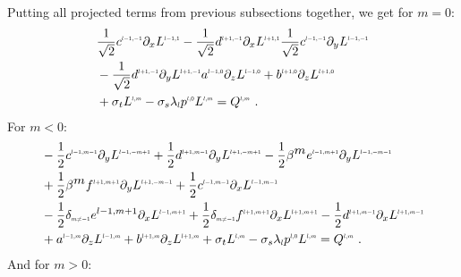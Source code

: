 \documentclass{egpubl}
\begin{document}
Putting all projected terms from previous subsections together, we get for $m=0$:
\begin{align}
&
\frac{1}{\sqrt{2}}c^{\scaleto{l-1,-1}{4pt}}\partial_x L^{\scaleto{l-1,1}{4pt}}
-\frac{1}{\sqrt{2}}d^{\scaleto{l+1,-1}{4pt}}\partial_x L^{\scaleto{l+1,1}{4pt}}
\frac{1}{\sqrt{2}}c^{\scaleto{l-1,-1}{4pt}}\partial_y L^{\scaleto{l-1,-1}{4pt}}
\nonumber
\\&
-\frac{1}{\sqrt{2}}d^{\scaleto{l+1,-1}{4pt}}\partial_y L^{\scaleto{l+1,-1}{4pt}}
a^{\scaleto{l-1,0}{4pt}}\partial_z L^{\scaleto{l-1,0}{4pt}}
+b^{\scaleto{l+1,0}{4pt}}\partial_z L^{\scaleto{l+1,0}{4pt}}
\nonumber
\\&
+\sigma_t L^{\scaleto{l,m}{4pt}}
-\sigma_s\lambda_{\scaleto{l}{4pt}}p^{\scaleto{l,0}{4pt}}L^{\scaleto{l,m}{4pt}}
= Q^{\scaleto{l,m}{4pt}} \ .
\end{align}
For $m<0$:
\begin{align}
&-\frac{1}{2}c^{\scaleto{l-1,m-1}{4pt}}
\partial_y
L^{\scaleto{l-1,-m+1}{4pt}}
+\frac{1}{2}d^{\scaleto{l+1,m-1}{4pt}}
\partial_y
L^{\scaleto{l+1,-m+1}{4pt}}
-\frac{1}{2}\beta^{\scaleto{m}{4pt}}e^{\scaleto{l-1,m+1}{4pt}}
\partial_y
L^{\scaleto{l-1,-m-1}{4pt}}
\nonumber
\\&
+\frac{1}{2}\beta^{\scaleto{m}{4pt}}f^{\scaleto{l+1,m+1}{4pt}}
\partial_y
L^{\scaleto{l+1,-m-1}{4pt}}
+\frac{1}{2}c^{\scaleto{l-1,m-1}{4pt}}
\partial_x
L^{\scaleto{l-1,m-1}{4pt}}
\nonumber
\\&
-\frac{1}{2}\delta_{\scaleto{m\neq -1}{4pt}}e^{{l-1,m+1}}
\partial_x
L^{\scaleto{l-1,m+1}{4pt}}
+\frac{1}{2}\delta_{\scaleto{m\neq -1}{4pt}}f^{\scaleto{l+1,m+1}{4pt}}
\partial_x
L^{\scaleto{l+1,m+1}{4pt}}
-\frac{1}{2}d^{\scaleto{l+1,m-1}{4pt}}
\partial_x
L^{\scaleto{l+1,m-1}{4pt}}
\nonumber
\\&
+a^{\scaleto{l-1,m}{4pt}}
\partial_z
L^{\scaleto{l-1,m}{4pt}}
+b^{\scaleto{l+1,m}{4pt}}
\partial_z
L^{\scaleto{l+1,m}{4pt}}
+\sigma_t L^{\scaleto{l,m}{4pt}}
-\sigma_s\lambda_{\scaleto{l}{4pt}}p^{\scaleto{l,0}{4pt}}L^{\scaleto{l,m}{4pt}}
= Q^{\scaleto{l,m}{4pt}} \ .
\end{align}
And for $m>0$:
\end{document}
